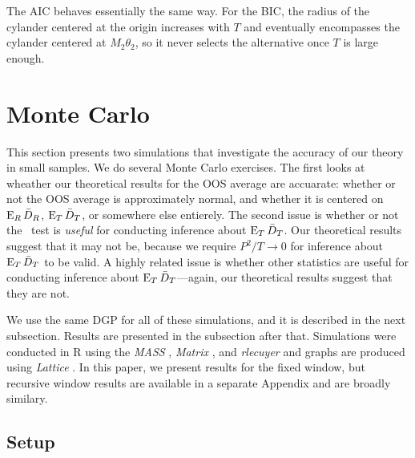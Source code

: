 \documentclass[12pt]{article}
\begin{document}
The AIC behaves essentially the same way. For the BIC, the radius of
the cylander centered at the origin increases with $T$ and eventually
encompasses the cylander centered at $M_2 \theta_2$, so it never
selects the alternative once $T$ is large enough.
\section{Monte Carlo}
\label{sec:mc}

This section presents two simulations that investigate the accuracy of
our theory in small samples.
We do several Monte Carlo exercises. The first looks at wheather our
theoretical results for the OOS average are accuarate: whether or not
the OOS average is approximately normal, and whether it is centered on
$\operatorname{E}_R \bar{D}_{R}$, $\operatorname{E}_T \bar{D}_{T}$, or somewhere else entierely. The second
issue is whether or not the \oost\ test is \emph{useful} for
conducting inference about $\operatorname{E}_T \bar{D}_{T}$. Our theoretical results
suggest that it may not be, because we require $P^2/T \to 0$ for
inference about $\operatorname{E}_T \bar{D}_{T}$ to be valid. A highly related issue is
whether other statistics are useful for conducting inference about
$\operatorname{E}_T \bar{D}_{T}$---again, our theoretical results suggest that they are
not.

We use the same DGP for all of these simulations, and it is described
in the next subsection. Results are presented in the subsection after
that. Simulations were conducted in R \citep{Rde:10} using the
\emph{MASS} \citep{VeR:02}, \emph{Matrix} \citep{BM:13}, and
\emph{rlecuyer} \citep{SR:12} and graphs are produced using
\emph{Lattice} \citep{Sar:10}. In this paper, we present results for
the fixed window, but recursive window results are available in a
separate Appendix and are broadly similary.

\subsection{Setup}
\label{sec:simulation-design}
\end{document}
